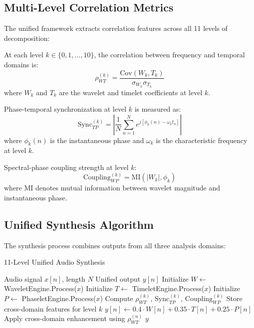 \subsection{Multi-Level Correlation Metrics}

The unified framework extracts correlation features across all 11 levels of decomposition:

\begin{definition}
At each level $k \in \{0,1,...,10\}$, the correlation between frequency and temporal domains is:
\begin{equation}
\rho_{WT}^{(k)} = \frac{\text{Cov}(W_k, T_k)}{\sigma_{W_k} \sigma_{T_k}}
\end{equation}
where $W_k$ and $T_k$ are the wavelet and timelet coefficients at level $k$.
\end{definition}

\begin{definition}
Phase-temporal synchronization at level $k$ is measured as:
\begin{equation}
\text{Sync}_{TP}^{(k)} = \left|\frac{1}{N}\sum_{n=1}^{N} e^{j[\phi_k(n) - \omega_k t_n]}\right|
\end{equation}
where $\phi_k(n)$ is the instantaneous phase and $\omega_k$ is the characteristic frequency at level $k$.
\end{definition}

\begin{definition}
Spectral-phase coupling strength at level $k$:
\begin{equation}
\text{Coupling}_{WP}^{(k)} = \text{MI}(|W_k|, \phi_k)
\end{equation}
where $\text{MI}$ denotes mutual information between wavelet magnitude and instantaneous phase.
\end{definition}

\subsection{Unified Synthesis Algorithm}

The synthesis process combines outputs from all three analysis domains:

\begin{algorithm}[H]
\caption{11-Level Unified Audio Synthesis}
\begin{algorithmic}[1]
\REQUIRE Audio signal $x[n]$, length $N$
\ENSURE Unified output $y[n]$
\STATE Initialize $W \leftarrow$ WaveletEngine.Process($x$)
\STATE Initialize $T \leftarrow$ TimeletEngine.Process($x$)
\STATE Initialize $P \leftarrow$ PhaseletEngine.Process($x$)
    \STATE Compute $\rho_{WT}^{(k)}$, $\text{Sync}_{TP}^{(k)}$, $\text{Coupling}_{WP}^{(k)}$
    \STATE Store cross-domain features for level $k$
\ENDFOR
{}
    \STATE $y[n] \leftarrow 0.4 \cdot W[n] + 0.35 \cdot T[n] + 0.25 \cdot P[n]$
        \STATE Apply cross-domain enhancement using $\rho_{WT}^{(n)}$
    \ENDIF
\ENDFOR
\RETURN $y$
\end{algorithmic}
\end{algorithm}


